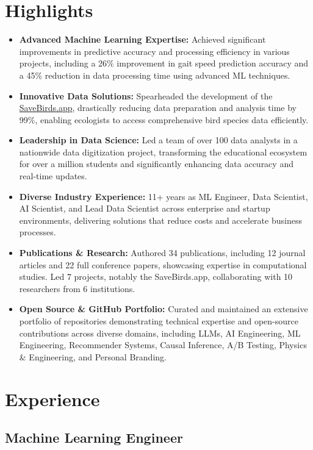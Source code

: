\documentclass[11pt]{article} %
\begin{document}
\section{Highlights}
\begin{itemize}[itemsep=5pt]
	\item \textbf{Advanced Machine Learning Expertise:} Achieved significant improvements in predictive accuracy and processing efficiency in various projects, including a 26\% improvement in gait speed prediction accuracy and a 45\% reduction in data processing time using advanced ML techniques.
	\item \textbf{Innovative Data Solutions:} Spearheaded the development of the \href{https://savebirds.app/}{SaveBirds.app}, drastically reducing data preparation and analysis time by 99\%, enabling ecologists to access comprehensive bird species data efficiently.
	\item \textbf{Leadership in Data Science:} Led a team of over 100 data analysts in a nationwide data digitization project, transforming the educational ecosystem for over a million students and significantly enhancing data accuracy and real-time updates.
	\item \textbf{Diverse Industry Experience:} 11+ years as ML Engineer, Data Scientist, AI Scientist, and Lead Data Scientist across enterprise and startup environments, delivering solutions that reduce costs and accelerate business processes.
	\item \textbf{Publications \& Research:} Authored 34 publications, including 12 journal articles and 22 full conference papers, showcasing expertise in computational studies. Led 7 projects, notably the SaveBirds.app, collaborating with 10 researchers from 6 institutions. 
	\item \textbf{Open Source \& GitHub Portfolio:} Curated and maintained an extensive portfolio of repositories demonstrating technical expertise and open-source contributions across diverse domains, including LLMs, AI Engineering, ML Engineering, Recommender Systems, Causal Inference, A/B Testing, Physics \& Engineering, and Personal Branding.
\end{itemize}

\section{Experience}
\subsection{Machine Learning Engineer}
\end{document}
